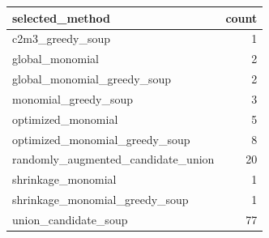 \begin{tabular}{lr}
\toprule
selected\_method & count \\
\midrule
c2m3\_greedy\_soup & 1 \\
global\_monomial & 2 \\
global\_monomial\_greedy\_soup & 2 \\
monomial\_greedy\_soup & 3 \\
optimized\_monomial & 5 \\
optimized\_monomial\_greedy\_soup & 8 \\
randomly\_augmented\_candidate\_union & 20 \\
shrinkage\_monomial & 1 \\
shrinkage\_monomial\_greedy\_soup & 1 \\
union\_candidate\_soup & 77 \\
\bottomrule
\end{tabular}
